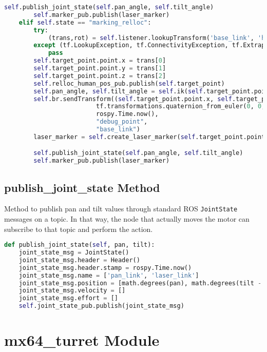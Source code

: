 \begin{lstlisting}[caption={Update Target Pose Point},label={lst:updatetargetpose},language=Python]
        self.publish_joint_state(self.pan_angle, self.tilt_angle)
        self.marker_pub.publish(laser_marker)
    elif self.state == "marking_relloc":
        try:
            (trans,rot) = self.listener.lookupTransform('base_link', 'human_footprint', rospy.Time(0))
        except (tf.LookupException, tf.ConnectivityException, tf.ExtrapolationException):
            pass
        self.target_point.point.x = trans[0]
        self.target_point.point.y = trans[1]
        self.target_point.point.z = trans[2]
        self.relloc_human_pos_pub.publish(self.target_point)
        self.pan_angle, self.tilt_angle = self.ik(self.target_point.point.x, self.target_point.point.y, self.target_point.point.z)
        self.br.sendTransform((self.target_point.point.x, self.target_point.point.y, self.target_point.point.z),
                         tf.transformations.quaternion_from_euler(0, 0, 0),
                         rospy.Time.now(),
                         "debug_point",
                         "base_link")
        laser_marker = self.create_laser_marker(self.target_point.point)

        self.publish_joint_state(self.pan_angle, self.tilt_angle)
        self.marker_pub.publish(laser_marker)
\end{lstlisting}
\subsection*{publish\_joint\_state Method} \label{publishJointState}
Method to publish pan and tilt values through standard ROS \texttt{JointState} messages on a topic. In that way, the node that actually moves the motor can subscribe to that topic and perform the action.
\begin{lstlisting}[caption={Publish Joint State},label={lst:publishjointstate},language=Python]
def publish_joint_state(self, pan, tilt):
    joint_state_msg = JointState()
    joint_state_msg.header = Header()
    joint_state_msg.header.stamp = rospy.Time.now()
    joint_state_msg.name = ['pan_link', 'laser_link']
    joint_state_msg.position = [math.degrees(pan), math.degrees(tilt - np.pi/2)]
    joint_state_msg.velocity = []
    joint_state_msg.effort = []
    self.joint_state_pub.publish(joint_state_msg)
\end{lstlisting}

\section*{mx64\_turret Module}
